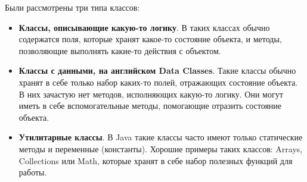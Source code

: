 Были рассмотрены три типа классов:
\begin{itemize}
	\item \textbf{Классы, описывающие какую-то логику}. В таких классах
		обычно содержатся поля, которые хранят какое-то состояние объекта, и
		методы, позволяющие выполнять какие-то действия с объектом.
	\item \textbf{Классы с данными, на английском Data Classes}. Такие
		классы обычно хранят в себе только набор каких-то полей, отражающих
		состояние объекта. В них зачастую нет методов, исполняющих какую-то
		логику. Они могут иметь в себе вспомогательные методы, помогающие
		отразить состояние объекта.
	\item \textbf{Утилитарные классы}. В Java такие классы часто имеют
		только статические методы и переменные (константы). Хорошие
		примеры таких классов: Arrays, Collections или Math, которые хранят в
		себе набор полезных функций для работы.
\end{itemize}

